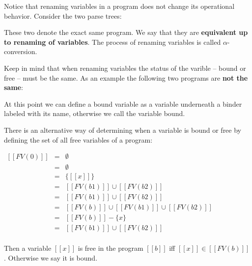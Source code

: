 \documentclass{article}
\begin{document}
Notice that renaming variables in a program does not change its
operational behavior.  Consider the two parse trees:
\begin{center}
\end{center}
These two denote the exact same program.  We say that they are
\textbf{equivalent up to renaming of variables}.  The process of
renaming variables is called $\alpha$-conversion.

Keep in mind that when renaming variables the status of the varible --
bound or free -- must be the same.  As an example the following two
programs are \textbf{not the same}:
\begin{center}
\end{center}
At this point we can define a bound variable as a variable underneath
a binder labeled with its name, otherwise we call the variable bound.

There is an alternative way of determining when a variable is bound or
free by defining the set of all free variables of a program:
\begin{center}
  \begin{math}
    \begin{array}{lll}
      [[FV(0)]] & = & \emptyset\\
      [[FV(1)]] & = & \emptyset\\
      [[FV(x)]] & = & \{[[x]]\}\\
      [[FV(b1 x b2)]] & = & [[FV(b1)]] \cup [[FV(b2)]]\\
      [[FV(b1 + b2)]] & = & [[FV(b1)]] \cup [[FV(b2)]]\\
      [[FV(if b b1 b2)]] & = & [[FV(b)]] \cup [[FV(b1)]] \cup [[FV(b2)]]\\
      [[FV(fun x => b)]] & = & [[FV(b)]] - \{x\}\\
      [[FV(app b1 b2)]] & = & [[FV(b1)]] \cup [[FV(b2)]]\\
    \end{array}
  \end{math}
\end{center}
Then a variable $[[x]]$ is free in the program $[[b]]$ iff $[[x]]\in
[[FV(b)]]$. Otherwise we say it is bound.
\end{document}
